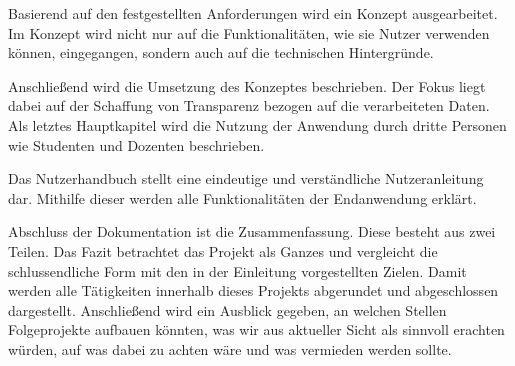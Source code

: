 Basierend auf den festgestellten Anforderungen wird ein Konzept ausgearbeitet.
Im Konzept wird nicht nur auf die Funktionalitäten, wie sie Nutzer verwenden können, eingegangen, sondern auch auf die technischen Hintergründe.

Anschließend wird die Umsetzung des Konzeptes beschrieben.
Der Fokus liegt dabei auf der Schaffung von Transparenz bezogen auf die verarbeiteten Daten.
Als letztes Hauptkapitel wird die Nutzung der Anwendung durch dritte Personen wie Studenten und Dozenten beschrieben.

Das Nutzerhandbuch stellt eine eindeutige und verständliche Nutzeranleitung dar.
Mithilfe dieser werden alle Funktionalitäten der Endanwendung erklärt.

Abschluss der Dokumentation ist die Zusammenfassung.
Diese besteht aus zwei Teilen.
Das Fazit betrachtet das Projekt als Ganzes und vergleicht die schlussendliche Form mit den in der Einleitung vorgestellten Zielen. Damit werden alle Tätigkeiten innerhalb dieses Projekts abgerundet und abgeschlossen dargestellt.
Anschließend wird ein Ausblick gegeben, an welchen Stellen Folgeprojekte aufbauen könnten, was wir aus aktueller Sicht als sinnvoll erachten würden, auf was dabei zu achten wäre und was vermieden werden sollte.



\clearpage
